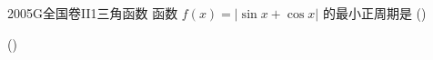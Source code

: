 
\begin{problem}{2005}{G}{全国卷II}{1}{三角函数}
函数 $ f(x)=|\sin x+\cos x| $ 的最小正周期是 (\hspace{1cm})

(\hspace{1cm})
\begin{choices}
\choice{{$\pi$}}
\choice{{$2\pi$}}
\end{choices}
\end{problem}

\begin{answer}

\end{answer}

\begin{solutions}

\end{solutions}
